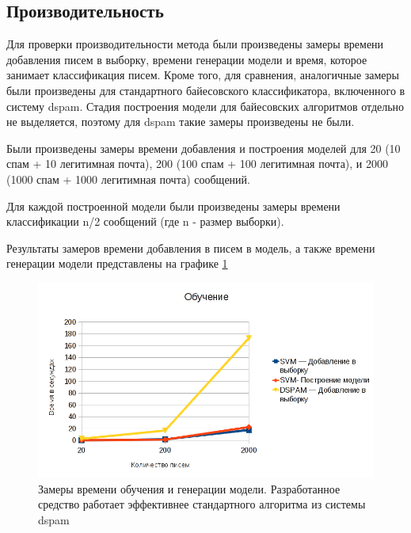 \subsection{Производительность}
Для проверки производительности метода были произведены замеры времени добавления писем в выборку, времени генерации модели и время, которое занимает классификация писем. Кроме того, для сравнения, аналогичные замеры были произведены для стандартного байесовского классификатора, включенного в систему dspam. Стадия построения модели для байесовских алгоритмов отдельно не выделяется, поэтому для dspam такие замеры произведены не были.

Были произведены замеры времени добавления и построения моделей для 20 (10 спам + 10 легитимная почта), 200 (100 спам + 100 легитимная почта),  и 2000 (1000 спам + 1000 легитимная почта) сообщений.

Для каждой построенной модели были произведены замеры времени классификации n/2 сообщений (где n - размер выборки). 

Результаты замеров  времени добавления в писем в модель, а также  времени генерации модели  представлены на графике \ref{EXLEARNING}

\begin{figure}[h]
\begin{center}
\includegraphics[width=15cm]{img/learn}
\end{center}
\caption{Замеры времени обучения и генерации модели. Разработанное средство работает эффективнее стандартного алгоритма из системы dspam}
\label{EXLEARNING}
\end{figure}


